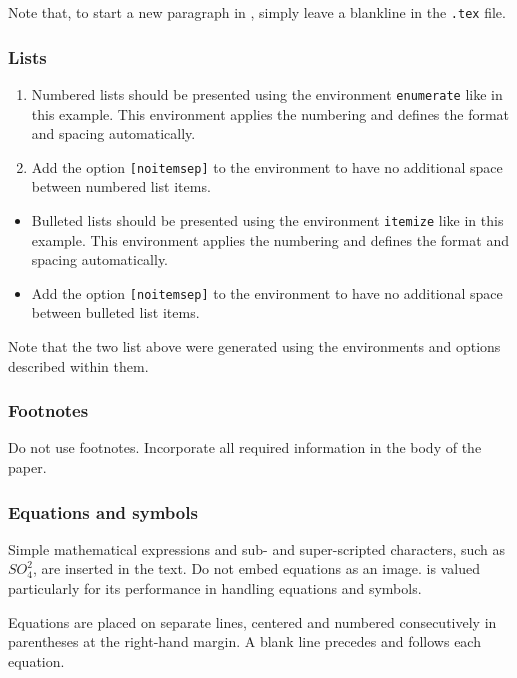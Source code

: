 \documentclass[a4paper, 10pt, twocolumn, twoside]{article}
\begin{document}
Note that, to start a new paragraph in , simply leave a blankline in the \verb|.tex| file. 

\subsubsection{Lists}

\begin{enumerate}[noitemsep]
\item
Numbered lists should be presented using the environment \verb|enumerate| like in this example. 
This environment applies the numbering and defines the format and spacing automatically. 
\item 
Add the option \verb|[noitemsep]| to the environment to have no additional space between numbered list items.
\end{enumerate}

\begin{itemize}[noitemsep]
\item
Bulleted lists should be presented using the environment \verb|itemize| like in this example. 
This environment applies the numbering and defines the format and spacing automatically. 
\item 
Add the option \verb|[noitemsep]| to the environment to have no additional space between bulleted list items.
\end{itemize}

Note that the two list above were generated using the environments and options described within them.

\subsubsection{Footnotes}

Do not use footnotes. Incorporate all required information in the body of the paper.

\subsubsection{Equations and symbols}

Simple mathematical expressions and sub- and super-scripted characters, such as $SO_4^2$, are inserted in the text. 
Do not embed equations as an image.
 is valued particularly for its performance in handling equations and symbols.

Equations are placed on separate lines, centered and numbered consecutively in parentheses at the right-hand margin. 
A blank line precedes and follows each equation.
\end{document}
